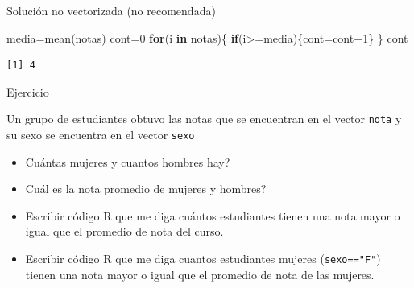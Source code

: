 \documentclass[
  ignorenonframetext,
  aspectratio=169,
  spanish,
]{beamer}
\newenvironment{Shaded}{\begin{snugshade}}{\end{snugshade}}
\newcommand{\ControlFlowTok}[1]{\textcolor[rgb]{0.00,0.23,0.31}{\textbf{#1}}}
\newcommand{\DecValTok}[1]{\textcolor[rgb]{0.68,0.00,0.00}{#1}}
\newcommand{\FunctionTok}[1]{\textcolor[rgb]{0.28,0.35,0.67}{#1}}
\newcommand{\NormalTok}[1]{\textcolor[rgb]{0.00,0.23,0.31}{#1}}
\newcommand{\OtherTok}[1]{\textcolor[rgb]{0.00,0.23,0.31}{#1}}
\newcommand{\SpecialCharTok}[1]{\textcolor[rgb]{0.37,0.37,0.37}{#1}}
\providecommand{\tightlist}{%
  \setlength{\itemsep}{0pt}\setlength{\parskip}{0pt}}
\begin{document}
\begin{frame}[fragile]{Solución no vectorizada (no recomendada)}
\label{soluciuxf3n-no-vectorizada-no-recomendada}
\begin{Shaded}
\begin{Highlighting}[]
\NormalTok{media}\OtherTok{=}\FunctionTok{mean}\NormalTok{(notas)}
\NormalTok{cont}\OtherTok{=}\DecValTok{0}
\ControlFlowTok{for}\NormalTok{(i }\ControlFlowTok{in}\NormalTok{ notas)\{}
\ControlFlowTok{if}\NormalTok{(i}\SpecialCharTok{\textgreater{}=}\NormalTok{media)\{cont}\OtherTok{=}\NormalTok{cont}\SpecialCharTok{+}\DecValTok{1}\NormalTok{\} }
\NormalTok{\}}
\NormalTok{cont}
\end{Highlighting}
\end{Shaded}

\begin{verbatim}
[1] 4
\end{verbatim}
\end{frame}

\begin{frame}[fragile]{Ejercicio}
\label{ejercicio-1}
\begin{tcolorbox}[enhanced jigsaw, leftrule=.75mm, left=2mm, colback=white, toptitle=1mm, bottomrule=.15mm, arc=.35mm, breakable, title=\textcolor{quarto-callout-important-color}{\faExclamation}\hspace{0.5em}{Importante}, coltitle=black, colbacktitle=quarto-callout-important-color!10!white, bottomtitle=1mm, opacityback=0, rightrule=.15mm, toprule=.15mm, colframe=quarto-callout-important-color-frame, opacitybacktitle=0.6, titlerule=0mm]

Un grupo de estudiantes obtuvo las notas que se encuentran en el vector
\texttt{nota} y su sexo se encuentra en el vector \texttt{sexo}

\begin{itemize}
\tightlist
\item
  Cuántas mujeres y cuantos hombres hay?
\item
  Cuál es la nota promedio de mujeres y hombres?
\item
  Escribir código R que me diga cuántos estudiantes tienen una nota
  mayor o igual que el promedio de nota del curso.
\item
  Escribir código R que me diga cuantos estudiantes mujeres
  (\texttt{sexo=="F"}) tienen una nota mayor o igual que el promedio de
  nota de las mujeres.\\
\end{itemize}

\end{tcolorbox}
\end{frame}
\end{document}
